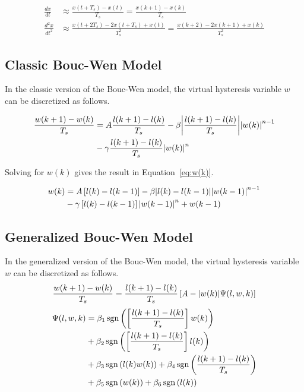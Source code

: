 \begin{align}
\frac{dx}{dt} &\approx \frac{x(t+T_s) - x(t)}{T_s} = \frac{x(k+1) - x(k)}{T_s} \label{eq:approx_1}\\
\frac{d^2x}{dt^2} &\approx \frac{x(t+2T_s) - 2x(t+T_s) + x(t)}{T_s^{2}} =
\frac{x(k+2)-2x(k+1)+x(k)}{T_s^2} \label{eq:approx_2}
\end{align}
\subsection{Classic Bouc-Wen Model}

In the classic version of the Bouc-Wen model,
the virtual hysteresis variable $w$ can be discretized as follows.

\begin{align}
\frac{w(k+1)-w(k)}{T_s} &= A \frac{l(k+1)-l(k)}{T_s} - \beta \abs{\frac{l(k+1)-l(k)}{T_s}}\abs{w(k)}^{n-1} \nonumber \\ 
&- \gamma \frac{l(k+1)-l(k)}{T_s} \abs{w(k)}^n
\end{align}

Solving for $w(k)$ gives the result in Equation~\ref{eq:w(k)}.

\begin{align}
w(k) &= A\left[l(k)-l(k-1)\right] - \beta \abs{l(k)-l(k-1)}\abs{w(k-1)}^{n-1} \nonumber \\
 &- \gamma \left[l(k)-l(k-1)\right]\abs{w(k-1)}^n + w(k-1)
 \label{eq:w(k)}
\end{align}

\subsection{Generalized Bouc-Wen Model}

In the generalized version of the Bouc-Wen model,
the virtual hysteresis variable $w$ can be discretized as follows.
\begin{align}
\frac{w(k+1)-w(k)}{T_s} = \frac{l(k+1)-l(k)}{T_s}\left[A - \abs{w(k)}\Psi(l,w,k)\right]
\label{eq:w_generalized_cont}
\end{align}
\begin{equation}
	\begin{split}
	\Psi(l,w,k)&=\beta_1\operatorname{sgn}\left(\left[\frac{l(k+1)-l(k)}{T_s}\right]w(k)\right) \\
	&+\beta_2 \operatorname{sgn}\left(\left[\frac{l(k+1)-l(k)}{T_s}\right]l(k)\right) \\
	&+\beta_3 \operatorname{sgn}\left(l(k)w(k)\right) + \beta_4 \operatorname{sgn}\left(\frac{l(k+1)-l(k)}{T_s}\right) \\
	&+\beta_5 \operatorname{sgn}\left(w(k)\right) + \beta_6 \operatorname{sgn}\left(l(k)\right)
	\end{split}
\end{equation}

